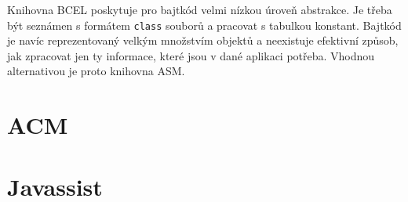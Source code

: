 
Knihovna BCEL poskytuje pro bajtkód velmi nízkou úroveň abstrakce. Je třeba být seznámen s formátem \texttt{class} souborů a pracovat s tabulkou konstant. Bajtkód je navíc reprezentovaný velkým množstvím objektů a neexistuje efektivní způsob, jak zpracovat jen ty informace, které jsou v dané aplikaci potřeba. Vhodnou alternativou je proto knihovna ASM.







\section{ACM}


\section{Javassist}



